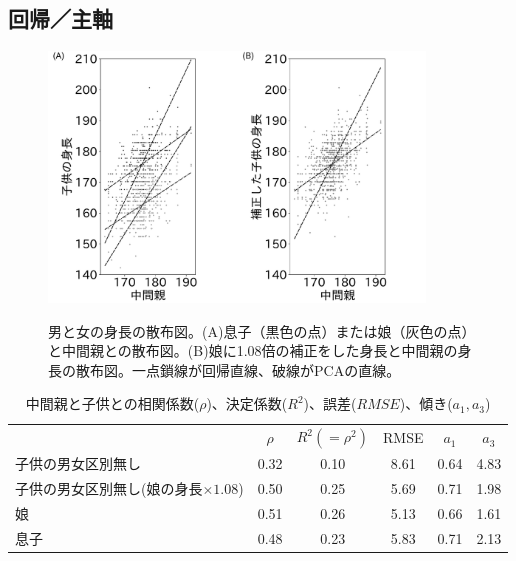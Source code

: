 \subsection{回帰／主軸}


\begin{figure}
 \begin{center}
  \includegraphics[width=10cm]{./image/16_/Galton/male_female_scatter.pdf}
  \label{fig:Galton_male_female_scatter} \caption{男と女の身長の散布図。(A)息子（黒色の点）または娘（灰色の点）と中間親との散布図。(B)娘に1.08倍の補正をした身長と中間親の身長の散布図。一点鎖線が回帰直線、破線がPCAの直線。}
 \end{center}
\end{figure}

\begin{table}[http]
 \centering \caption{中間親と子供との相関係数($\rho$)、決定係数($R^2$)、誤差($RMSE$)、傾き($a_1,a_3$)}
\begin{tabular}{lccccc}
 & $\rho$ & $R^2(=\rho^2)$ & RMSE & $a_1$ &$a_3$ \\
子供の男女区別無し & 0.32 & 0.10 & 8.61 & 0.64 & 4.83 \\
子供の男女区別無し(娘の身長$\times 1.08$) & 0.50 & 0.25 & 5.69 & 0.71& 1.98 \\
娘 & 0.51 & 0.26 & 5.13 & 0.66 & 1.61 \\
息子 & 0.48 & 0.23 & 5.83 & 0.71 & 2.13 \\
\end{tabular}
\end{table}




